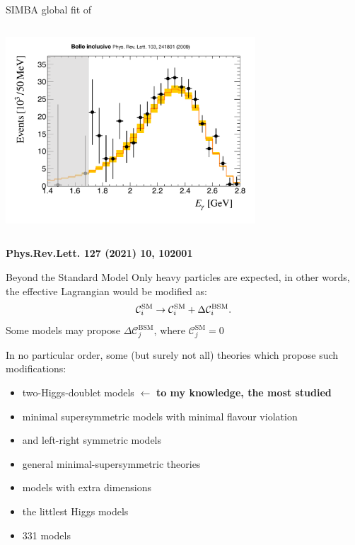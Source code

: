 \documentclass[xcolor=dvipsnames]{beamer}
\begin{document}
\begin{frame}{SIMBA global fit of \BtoXsgamma}
\begin{columns}
         \includegraphics[width=0.7\textwidth]{figures/belle_spec_default_la055_a3.pdf}
      \end{columns}
      \begin{flushright}
         {\tiny\textbf{Phys.Rev.Lett. 127 (2021) 10, 102001}}
      \end{flushright}
   \end{frame}

\begin{frame}{Beyond the Standard Model}
   \scriptsize
   Only heavy particles are expected, in other words, the effective Lagrangian would be modified as:
   \begin{equation}\nonumber
      \mathcal{C}_i^{\mathrm{SM}} \rightarrow \mathcal{C}_i^{\mathrm{SM}} + \Delta\mathcal{C}_i^{\mathrm{BSM}}.
   \end{equation}
   Some models may propose $\Delta\mathcal{C}_j^{\mathrm{BSM}}$, where $\mathcal{C}_j^{\mathrm{SM}}=0$

\vspace{10pt}
   In no particular order, some (but surely not all) theories which propose such modifications:
   \begin{itemize}
      \item two-Higgs-doublet models $\leftarrow$ \textbf{to my knowledge, the most studied}
      \item minimal supersymmetric models with minimal flavour violation
      \item and left-right symmetric models
      \item general minimal-supersymmetric theories
      \item models with extra dimensions
      \item the littlest Higgs models
      \item 331 models
   \end{itemize}
\end{frame}
\end{document}
